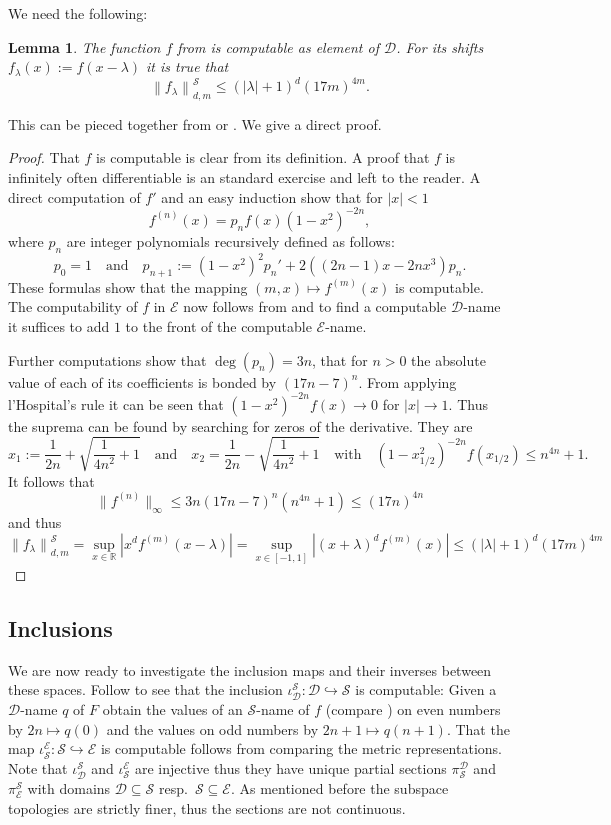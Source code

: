 \documentclass{eptcs-modified}
\newtheorem{lemma}[theorem]{Lemma}
\newcommand{\RR}{\mathbb{R}}
\newcommand{\EE}{\mathcal E}
\newcommand{\SF}{\mathcal S}
\newcommand{\TF}{\mathcal D}
\newcommand{\abs}[1]{\left|#1\right|}
\newcommand{\norm}[1]{\left\|#1\right\|}
\newcommand{\bnorm}[1]{\big\|#1\big\|}
\begin{document}
			We need the following:
			\begin{lemma}\label{resu:f and its shifts}
				The function $f$ from  is computable as element of $\TF$.
				For its shifts $f_\lambda(x) := f(x-\lambda)$ it is true that
				\[ \norm{f_\lambda}^{\SF}_{d,m} \leq (\abs\lambda+1)^d (17m)^{4m} .\]
			\end{lemma}
			This can be pieced together from \cite{zhong} or \cite{MR3377508}.
			We give a direct proof.
			\begin{proof}
				That $f$ is computable is clear from its definition.
				A proof that $f$ is infinitely often differentiable is an standard exercise and left to the reader.
				A direct computation of $f'$ and an easy induction show that for $\abs{x}<1$
				\[ f^{(n)}(x) = p_n f(x) (1-x^2)^{-2n}, \]
				where $p_n$ are integer polynomials recursively defined as follows:
				\[ p_0 = 1 \quad\text{and}\quad p_{n+1}:= (1-x^2)^2 p_n' + 2((2n-1)x - 2nx^3)p_n. \]
				These formulas show that the mapping $(m,x)\mapsto f^{(m)}(x)$ is computable.
				The computability of $f$ in $\EE$ now follows from  and to find a computable $\TF$-name it suffices to add $1$ to the front of the computable $\EE$-name.

				Further computations show that $\deg(p_n) = 3n$, that for $n>0$ the absolute value of each of its coefficients is bonded by $(17n-7)^n$.
				From applying l'Hospital's rule it can be seen that $(1-x^2)^{-2n}f(x)\to 0$ for $\abs x\to 1$.
				Thus the suprema can be found by searching for zeros of the derivative.
				They are
				\[ x_1 := \frac1{2n} + \sqrt{\frac1{4n^2} +1} \quad\text{and}\quad x_2 =\frac1{2n} - \sqrt{\frac1{4n^2} +1}\quad\text{with}\quad (1-x_{1/2}^2)^{-2n} f(x_{1/2}) \leq n^{4n}+1. \]
				It follows that
				\[ \bnorm{f^{(n)}}_\infty \leq 3n(17n-7)^n(n^{4n}+1)\leq (17n)^{4n} \]
				and thus
				\[ \norm{f_\lambda}^{\SF}_{d,m} = \sup_{x\in\RR} \abs{x^d f^{(m)}(x-\lambda)} = \sup_{x\in[-1,1]} \abs{(x+\lambda)^df^{(m)}(x)} \leq (\abs\lambda+1)^d(17m)^{4m} \]
			\end{proof}

		\subsection{Inclusions}
			We are now ready to investigate the inclusion maps and their inverses between these spaces.
			Follow \cite[Proposition 5.4]{zhong} to see that the inclusion $\iota_{\TF}^\SF : \TF\hookrightarrow\SF$ is computable:
			Given a $\TF$-name $q$ of $F$ obtain the values of an $\SF$-name of $f$ (compare ) on even numbers by $2n\mapsto q(0)$ and the values on odd numbers by $2n+1\mapsto q(n+1)$.
			That the map $\iota_{\SF}^\EE :\SF \hookrightarrow \EE$ is computable follows from comparing the metric representations.
			Note that $\iota_\TF^\SF$ and $\iota_\SF^\EE$ are injective thus they have unique partial sections $\pi_\SF^\TF$ and $\pi_\EE^\SF$ with domains $\TF\subseteq \SF$ resp.\ $\SF\subseteq \EE$.
			As mentioned before the subspace topologies are strictly finer, thus the sections are not continuous.
\end{document}
